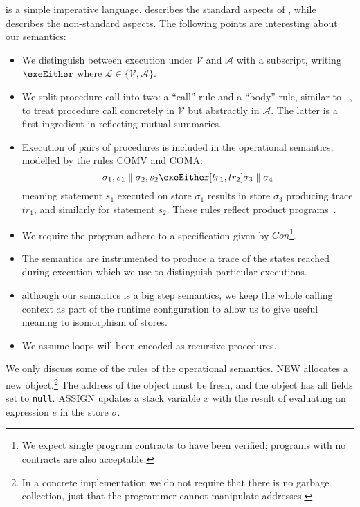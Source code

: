 \documentclass[runningheads,a4paper]{llncs}
\newcommand{\tr}{tr}
\newcommand*{\Contract}{\mathit{Con}}
\newcommand*{\parcomp}{\parallel}
\newcommand*{\metasem}{\mathcal{L}}
\newcommand*\Asemantics{\mathcal{A}}
\newcommand*\Vsemantics{\mathcal{V}}
\newcommand*{\composeRuleAbstract}{\textnormal{COMA}}
\newcommand*{\composeRuleConcrete}{\textnormal{COMV}}%
\newcommand*{\composeRuleVerified}{\composeRuleConcrete{}}
\newcommand*{\blAssign}{ASSIGN}
\newcommand*{\blNew}{NEW}
\newcommand*{\store}{\sigma}
\begin{document}
\lang{} is a simple imperative language.  describes the standard aspects of \lang{}, while  describes the non-standard aspects. The following points are interesting about our semantics: 
\begin{itemize}
\item  We distinguish between execution under $\Vsemantics$ and $\Asemantics$ with a subscript, writing $\exeEither$ where $\metasem \in \{\Vsemantics,\Asemantics\}$.
\item We split procedure call into two: a ``call'' rule and a ``body'' rule, similar to \citeauthor{Godlin09}~\cite{Godlin09}, to treat procedure call concretely in $\Vsemantics$ but abstractly in $\Asemantics$. The latter is a first ingredient in reflecting mutual summaries.
\item Execution of pairs of procedures is included in the operational semantics, modelled by the rules \composeRuleVerified{} and \composeRuleAbstract{}: \[\store_1,s_1 \parcomp \store_2,s_2 \exeEither[\tr_1,\tr_2] \store_3 \parcomp \store_4\] meaning statement $s_1$ executed on store $\store_1$ results in store $\store_3$ producing trace $\tr_1$, and similarly for statement $s_2$. These rules reflect product programs~\cite{Lahiri2012,Barthe2016,Banerjee2016}.
\item We require the program adhere to a specification given by $\Contract$\footnote{We expect single program contracts to have been verified; programs with no contracts are also acceptable.}.
\item The semantics are instrumented to produce a trace of the states reached during execution which we use to distinguish particular executions.
\item although our semantics is a big step semantics, we keep the whole calling context as part of the runtime configuration to allow us to give useful meaning to isomorphism of stores.
\item We assume loops will been encoded as recursive procedures.
\end{itemize}

We only discuss some of the rules of the operational semantics. \blNew{} allocates a new object.\footnote{In a concrete implementation we do not require that there is no garbage collection, just that the programmer cannot manipulate addresses.} The address of the object must be fresh, and the object has all fields set to \texttt{null}. \blAssign{} updates a stack variable $x$ with the result of evaluating an expression $e$ in the store $\store$.
\end{document}
